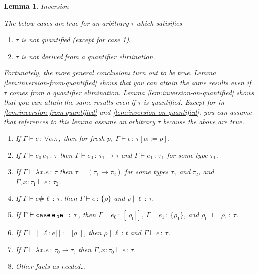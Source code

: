 \documentclass{article}
\newtheorem{lemma}{Lemma}
\newcommand{\variant}[1]{[\!|#1|\!]}
\newcommand{\case}[2]{\tt{case}\,#1\,#2}
\newcommand{\app}[2]{#1\,#2}
\newcommand{\lam}[2]{\lambda #1 . #2}
\newcommand{\hastp}[3]{#1 \vdash #2 \,:\, #3}
\newcommand{\haslbl}[3]{#1\;|\;#2\,:\, #3}
\newcommand{\caseVarRcd}[3]{#1 \;\sqsubseteq\; #2 \,:\, #3}
\begin{document}
\begin{lemma}{Inversion} \label{lem:inversion}

  The below cases are true for an arbitrary \(\tau\) which satisifies

  \begin{enumerate}
    \item \(\tau\) is not quantified (except for case 1).
    \item \(\tau\) is not derived from a quantifier elimination.
  \end{enumerate}

  Fortunately, the more general conclusions turn out to be true. Lemma
  \ref{lem:inversion-from-quantified} shows that you can attain the same results
  even if \(\tau\) comes from a quantifier elimination. Lemma
  \ref{lem:inversion-on-quantified} shows that you can attain the same results
  even if \(\tau\) is quantified. Except for in
  \ref{lem:inversion-from-quantified} and \ref{lem:inversion-on-quantified}, you
  can assume that references to this lemma assume an arbitrary \(\tau\) because
  the above are true.

  \mbox{}
\begin{enumerate}
\item If \(\hastp \Gamma e {\forall \alpha. \tau},\) then for fresh \(p\), \(\hastp \Gamma e
  {\tau[\alpha := p]}\).
\item If $\hastp{\Gamma}{\app{e_0}{e_1}}{\tau}$ then
  $\hastp{\Gamma}{e_0}{\tau_1\to\tau}$ and $\hastp{\Gamma}{e_1}{\tau_1}$ for some type $\tau_1$.
\item If $\hastp{\Gamma}{\lam{x}{e}}{\tau}$ then $\tau = (\tau_1\to\tau_2)$ for
some types $\tau_1$ and $\tau_2$, and
  $\hastp{\Gamma,x:\tau_1}{e}{\tau_2}$.
\item If \(\hastp \Gamma {e \# \ell} \tau\), then \(\hastp \Gamma e {\{\rho\}}\)
  and \(\haslbl \rho \ell \tau\).
\item If \(\hastp \Gamma {\case e_0 e_1} \tau\), then \(\hastp \Gamma {e_0}
  {\variant {\rho_0}}\), \(\hastp \Gamma {e_1} {\{\rho_1\}}\), and \(\caseVarRcd
  {\rho_0} {\rho_1} \tau\).
\item If \(\hastp \Gamma {\variant {\ell : e}} {\variant \rho}\), then \(\haslbl
  \rho \ell t\) and \(\hastp \Gamma e \tau\).
\item If \(\hastp \Gamma {\lambda x. e} {\tau_0 \to \tau}\), then \(\hastp
  {\Gamma, x : \tau_0} e \tau\).
\item Other facts as needed\ldots
\end{enumerate}
\end{lemma}
\end{document}

